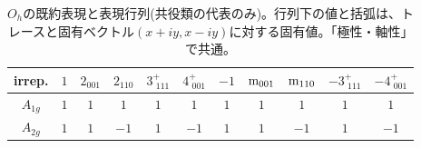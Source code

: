\documentclass[11pt]{easymemo}
\begin{document}
\begin{landscape}
  \begin{table}
    \tiny
    \caption{$O_{h}$の既約表現と表現行列(共役類の代表のみ)。行列下の値と括弧は、トレースと固有ベクトル$(x+iy,x-iy)$に対する固有値。「極性・軸性」で共通。
    }
    \label{tbl:6}
    \begin{center}
      \renewcommand{\arraystretch}{2.2}
      \begin{tabular}{ccccccccccc}
        \hline\hline
        irrep.      & $1$                           & $2{}_{001}$                   & $2{}_{110}$                   & $3^{+}_{\,\,111}$             & $4^{+}_{\,\,001}$             & $-1$                          & $\rm{m}_{001}$                & $\rm{m}_{110}$                & $-3^{+}_{\,\,111}$            & $-4^{+}_{\,\,001}$            \\\hline

        $A_{1g}^{}$ & $1$                           & $1$                           & $1$                           & $1$                           & $1$                           & $1$                           & $1$                           & $1$                           & $1$                           & $1$                           \\ \hline

        $A_{2g}^{}$ & $1$                           & $1$                           & $-1$                          & $1$                           & $-1$                          & $1$                           & $1$                           & $-1$                          & $1$                           & $-1$                          \\ \hline


\end{tabular}
\end{center}
\end{table}
\end{landscape}
\end{document}
